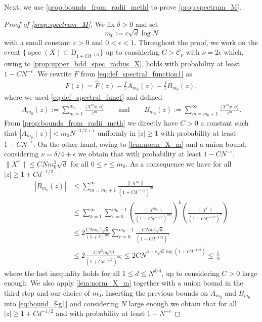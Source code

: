 \documentclass[10pt,a4paper]{amsart}
\DeclareMathOperator{\spec}{spec}
\newcommand{\abs}[1]{\left| #1 \right|}
\newcommand{\norm}[1]{\left\| #1 \right\|}
\numberwithin{equation}{section}
\begin{document}
Next, we use \cref{prop:bounds_from_radii_meth} to prove \cref{prop:spectrum_M}.  
\begin{proof}[Proof of \cref{prop:spectrum_M}]
    We fix $\delta >0$ and set 
    \begin{equation*}
        m_0:= c \sqrt{d} \log N
    \end{equation*}
    with a small constant $c>0$ and $0<\epsilon<1$. Throughout the proof, we work on the event $\{\spec(X) \subset \mathrm{D}_{1+C d^{-1/2}}\}$ up to considering $C> \mathcal{C}_{\nu} $ with $\nu = 2 \epsilon$ which, owing to  \cref{prop:upper_bdd_spec_radius_X}, holds with probability at least $1 - CN^{-\epsilon}$. We rewrite $F$ from \cref{eq:def_spectral_function1} as
    \begin{align}\label{eq:bound_f-g1}
        F(z) = \widehat{F}(z) - \frac{f}{z} A_{m_0}(z) - \frac{f}{z} B_{m_0}(z), 
    \end{align}
    where we used \eqref{eq:def_spectral_funct} and defined
    \begin{align*}
        A_{m_0} (z) := \sum_{m=1}^{m_0} \frac{\langle X^m \mathbf e, \mathbf e\rangle}{z^m} \qquad \text{and} \qquad B_{m_0} (z) := \sum_{m={m_0}+1}^\infty \frac{\langle X^m \mathbf e, \mathbf e\rangle}{z^m}.
    \end{align*}
   From \cref{prop:bounds_from_radii_meth} we directly have $C>0$ a constant such that $|A_{m_0}(z)| <  m_{0}N^{-1/2+\epsilon}$ uniformly in $\abs{z} \ge 1$ with probability at least $1 - CN^{-\epsilon}$. On the other hand, owing to \cref{lem:norm_X_m} and a union bound, considering $\nu = \delta/4 + \epsilon$ we obtain that with probability at least $1- CN^{-\epsilon}$, $\|X^r\| \le CNm_0^2\sqrt{d}$ for all $0 \le r \le m_{0}$. As a consequence we have for all $\abs{z} \ge 1+ C d^{-1/2} $
   \begin{align*}
       \abs{B_{m_0}(z)} &\le \sum_{m=m_0+1}^\infty \frac{\norm{X^m}}{(1+ C d^{-1/2} )^m} \\ 
       & \le \sum_{k=1}^\infty \sum_{r=0}^{m_0-1} \left(\frac{\norm{X^{m_0}}}{{(1+ C d^{-1/2} )^{m_0}}}\right)^k\left(\frac{\norm{X^r}}{(1+ C d^{-1/2} )^r}\right)\\
       &\le 2\frac{CN{m_0}^2\sqrt{d}}{(1+\delta)^{m_0}}\sum_{r=0}^{{m_0}-1}\frac{CNm_0^2\sqrt{d}}{(1+ C d^{-1/2} )^r} \\ 
       & \le  2\frac{CN^2{m_0}^5d}{(1+ C d^{-1/2} )^{m_0}}  \le 2CN^{ 3-  c \sqrt{d}  \log (1+ C d^{-1/2} )} \le \frac{1}{N}
   \end{align*}
where the last inequality holds for all $1 \le d \le N^{\delta/4}$, up to considering $ C >0$ large enough. We also apply \cref{lem:norm_X_m} together with a union bound in the third step and our choice of $m_0$. Inserting the previous bounds on $A_{m_0}$ and $B_{m_0}$ into \eqref{eq:bound_f-g1} and considering $N$ large enough we obtain that for all $  \abs{z} \ge 1+ C d^{-1/2}$ and with probability at least $1-N^{-\epsilon}$

\end{proof}
\end{document}
